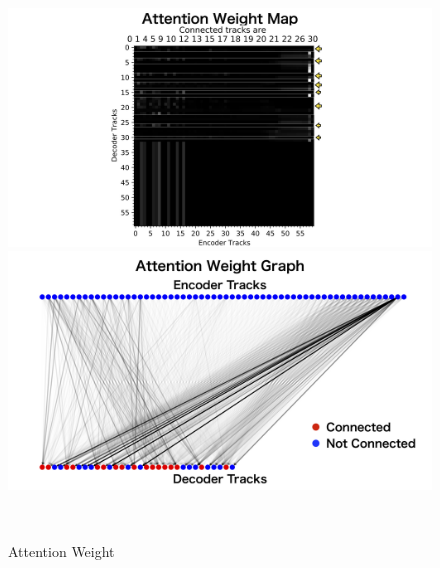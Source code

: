 \begin{figure}[htbp]
 \centering
   \begin{minipage}{1.0\textwidth}
    \centering
    \includegraphics[trim = 200 0 200 0, width=1.0\textwidth, clip]{Figure/3Networks/3-4-3-3AttentionWeightMap.png}
   \end{minipage}
   
   \begin{minipage}{1.0\textwidth}
   \centering
    \includegraphics[trim = 100 0 100 0, width=1.0\textwidth, clip]{Figure/3Networks/3-4-3-3AttentionWeightGraph.png}
   \end{minipage}
  \caption{Attention Weight}
  \label{3-4-3-3AttentionWeight}
\end{figure}











